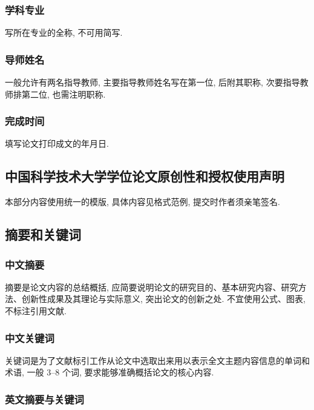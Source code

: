 \subsubsection{学科专业}

写所在专业的全称, 不可用简写.

\subsubsection{导师姓名}

一般允许有两名指导教师, 主要指导教师姓名写在第一位, 后附其职称, 次要指导教师排第二位, 也需注明职称.

\subsubsection{完成时间}

填写论文打印成文的年月日.

\subsection{中国科学技术大学学位论文原创性和授权使用声明}

本部分内容使用统一的模版, 具体内容见格式范例, 提交时作者须亲笔签名.

\subsection{摘要和关键词}

\subsubsection{中文摘要}

摘要是论文内容的总结概括, 应简要说明论文的研究目的、基本研究内容、研究方法、创新性成果及其理论与实际意义, 突出论文的创新之处. 不宜使用公式、图表, 不标注引用文献.

\subsubsection{中文关键词}

关键词是为了文献标引工作从论文中选取出来用以表示全文主题内容信息的单词和术语, 一般 3--8 个词, 要求能够准确概括论文的核心内容.

\subsubsection{英文摘要与关键词}

